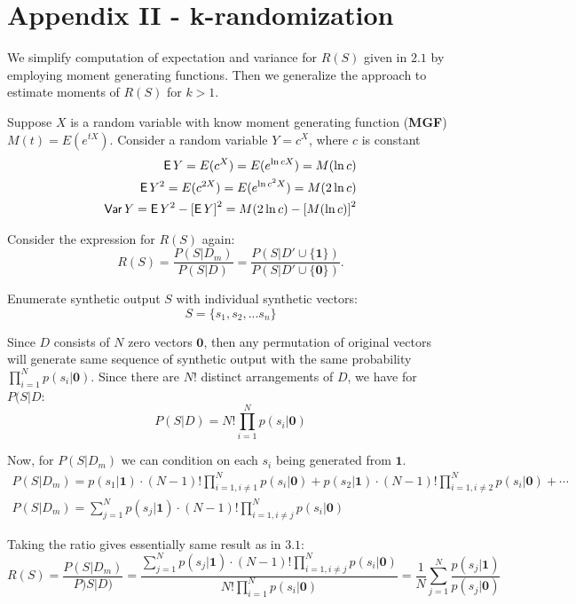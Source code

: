 \documentclass[11pt]{article}
\newcommand{\zv}{\textbf{0}}
\newcommand{\uv}{\textbf{1}}
\begin{document}
\section{Appendix II - k-randomization}

We simplify computation of expectation and variance for $R(S)$ given in $2.1$ by employing moment generating functions. Then we generalize the approach to estimate moments of $R(S)$ for $k>1$.

Suppose $X$ is a random variable with know moment generating function (\textbf{MGF}) $M(t) = E(e^{tX})$.
Consider a random variable $Y=c^X$, where $c$ is constant
\begin{align}
\operatorname{\mathsf{E}} Y = E(c^X) = E(e^{\ln{c}X}) = M(\ln{c}) \\
\operatorname{\mathsf{E}} Y^2 =  E(c^{2X}) = E(e^{\ln{c^2}X}) = M(2\ln{c}) \\
\operatorname{\mathsf{Var}} Y = \operatorname{\mathsf{E}} Y^2 - \left [ \operatorname{\mathsf{E}} Y \right ]^2 = M(2\ln{c}) -  \left [ M(\ln{c}) \right ]^2
\end{align}

Consider the expression for $R(S)$ again:
\begin{equation}
R(S) = \frac{P(S|D_m)}{P(S|D)} =  \frac{P(S|D' \cup \{\uv\})}{P(S|D' \cup \{\zv\})}.
\end{equation}

Enumerate synthetic output $S$ with individual synthetic vectors:
\[ S = \{s_1, s_2, ... s_n\} \]

Since $D$ consists of $N$ zero vectors $\zv$, then any permutation of original vectors will generate same sequence of synthetic output with the same probability $ \prod_{i=1}^N p(s_i| {\zv} )$.  Since there are $N!$ distinct arrangements of  $D$, we have for $P(S|D$:
\begin{equation}
P(S|D) = N! \prod_{i=1}^N p(s_i| {\zv} )
\end{equation}

Now, for $P(S|D_m)$ we can condition on each $s_i$ being generated from $\uv$.
\begin{align*}
P(S|D_m) = p(s_1|\uv) \cdot (N-1)! \prod_{i=1, i \ne 1}^N p(s_i| {\zv} ) + p(s_2|\uv)  \cdot (N-1)! \prod_{i=1, i \ne 2}^N p(s_i| \zv ) + \cdots \\
P(S|D_m) =  \sum_{j=1}^{N}  p(s_j|\uv)  \cdot (N-1)! \prod_{i=1, i \ne j}^{N} p(s_i| \zv )
\end{align*}

Taking the ratio gives essentially same result as in $3.1$:
\begin{equation}
R(S) = \frac{P(S|D_m)}{P)S|D)} = \frac{ \sum_{j=1}^{N}  p(s_j|\uv)  \cdot (N-1)! \prod_{i=1, i \ne j}^{N} p(s_i| \zv )} {N! \prod_{i=1}^N p(s_i| {\zv} )} =  \frac{1}{N} \sum_{j=1}^N \frac{p(s_j | \uv)} {p(s_j|\zv)}
\end{equation}
\end{document}
